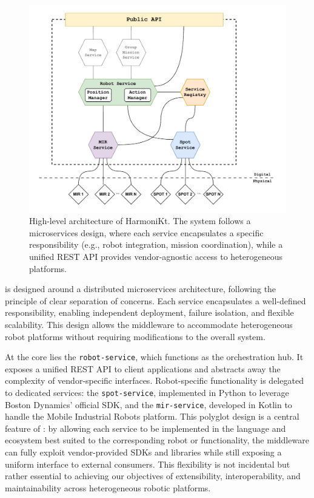 \documentclass[conference]{IEEEtran}
\begin{document}
\begin{figure}[htb]
    \centering
    \includegraphics[width=1\columnwidth]{images/arc.pdf}
    \caption{
        High-level architecture of HarmoniKt. 
        The system follows a microservices design, 
        where each service encapsulates a specific responsibility (e.g., robot integration, mission coordination),
        while a unified REST API provides vendor-agnostic access to heterogeneous platforms.
    }
    \label{fig:arc}
\end{figure}

\approach{} is designed around a distributed microservices architecture, 
 following the principle of clear separation of concerns. 
% 
Each service encapsulates a well-defined responsibility, 
 enabling independent deployment, failure isolation, and flexible scalability. 
% 
This design allows the middleware to accommodate heterogeneous robot platforms 
 without requiring modifications to the overall system.

At the core lies the \texttt{robot-service}, 
 which functions as the orchestration hub. 
% 
It exposes a unified REST API to client applications 
 and abstracts away the complexity of vendor-specific interfaces. 
% 
Robot-specific functionality is delegated to dedicated services: 
 the \texttt{spot-service}, implemented in Python to leverage Boston Dynamics' official SDK, 
 and the \texttt{mir-service}, developed in Kotlin to handle the Mobile Industrial Robots platform. 
% 
This polyglot design is a central feature of \approach{}: 
 by allowing each service to be implemented in the language 
 and ecosystem best suited to the corresponding robot or functionality,
  the middleware can fully exploit vendor-provided SDKs and libraries 
  while still exposing a uniform interface to external consumers. 
%  
This flexibility is not incidental but rather essential to achieving our objectives of 
 extensibility, interoperability, and maintainability across heterogeneous robotic platforms.
\end{document}
